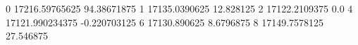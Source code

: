 0 17216.59765625 94.38671875
1 17135.0390625 12.828125
2 17122.2109375 0.0
4 17121.990234375 -0.220703125
6 17130.890625 8.6796875
8 17149.7578125 27.546875
